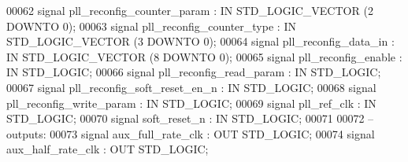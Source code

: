 \begin{DoxyCode}
00062                  \textcolor{keywordflow}{signal} \textcolor{vhdlchar}{pll_reconfig_counter_param} \textcolor{vhdlchar}{:} \textcolor{keywordflow}{IN} \textcolor{comment}{STD\_LOGIC\_VECTOR} \textcolor{vhdlchar}{(}\textcolor{vhdllogic}{}\textcolor{vhdllogic}{2} \textcolor{keywordflow}{DOWNTO} \textcolor{vhdllogic}{}\textcolor{vhdllogic}{0}\textcolor{vhdlchar}{)};
00063                  \textcolor{keywordflow}{signal} \textcolor{vhdlchar}{pll_reconfig_counter_type} \textcolor{vhdlchar}{:} \textcolor{keywordflow}{IN} \textcolor{comment}{STD\_LOGIC\_VECTOR} \textcolor{vhdlchar}{(}\textcolor{vhdllogic}{}\textcolor{vhdllogic}{3} \textcolor{keywordflow}{DOWNTO} \textcolor{vhdllogic}{}\textcolor{vhdllogic}{0}\textcolor{vhdlchar}{)};
00064                  \textcolor{keywordflow}{signal} \textcolor{vhdlchar}{pll_reconfig_data_in} \textcolor{vhdlchar}{:} \textcolor{keywordflow}{IN} \textcolor{comment}{STD\_LOGIC\_VECTOR} \textcolor{vhdlchar}{(}\textcolor{vhdllogic}{}\textcolor{vhdllogic}{8} \textcolor{keywordflow}{DOWNTO} \textcolor{vhdllogic}{}\textcolor{vhdllogic}{0}\textcolor{vhdlchar}{)};
00065                  \textcolor{keywordflow}{signal} \textcolor{vhdlchar}{pll_reconfig_enable} \textcolor{vhdlchar}{:} \textcolor{keywordflow}{IN} \textcolor{comment}{STD\_LOGIC};
00066                  \textcolor{keywordflow}{signal} \textcolor{vhdlchar}{pll_reconfig_read_param} \textcolor{vhdlchar}{:} \textcolor{keywordflow}{IN} \textcolor{comment}{STD\_LOGIC};
00067                  \textcolor{keywordflow}{signal} \textcolor{vhdlchar}{pll_reconfig_soft_reset_en_n} \textcolor{vhdlchar}{:} \textcolor{keywordflow}{IN} \textcolor{comment}{STD\_LOGIC};
00068                  \textcolor{keywordflow}{signal} \textcolor{vhdlchar}{pll_reconfig_write_param} \textcolor{vhdlchar}{:} \textcolor{keywordflow}{IN} \textcolor{comment}{STD\_LOGIC};
00069                  \textcolor{keywordflow}{signal} \textcolor{vhdlchar}{pll_ref_clk} \textcolor{vhdlchar}{:} \textcolor{keywordflow}{IN} \textcolor{comment}{STD\_LOGIC};
00070                  \textcolor{keywordflow}{signal} \textcolor{vhdlchar}{soft_reset_n} \textcolor{vhdlchar}{:} \textcolor{keywordflow}{IN} \textcolor{comment}{STD\_LOGIC};
00071 
00072 \textcolor{keyword}{              -- outputs:}
00073                  \textcolor{keywordflow}{signal} \textcolor{vhdlchar}{aux_full_rate_clk} \textcolor{vhdlchar}{:} \textcolor{keywordflow}{OUT} \textcolor{comment}{STD\_LOGIC};
00074                  \textcolor{keywordflow}{signal} \textcolor{vhdlchar}{aux_half_rate_clk} \textcolor{vhdlchar}{:} \textcolor{keywordflow}{OUT} \textcolor{comment}{STD\_LOGIC};

\end{DoxyCode}
